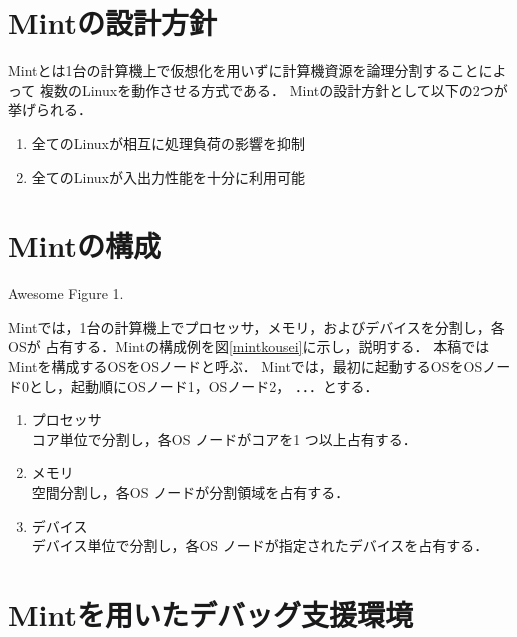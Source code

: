 \documentclass[tanilab-enum]{graduate}
\begin{document}
\section{Mintの設計方針}
Mintとは1台の計算機上で仮想化を用いずに計算機資源を論理分割することによって
複数のLinuxを動作させる方式である．
Mintの設計方針として以下の2つが挙げられる．
\begin{enumerate}
    \item 全てのLinuxが相互に処理負荷の影響を抑制
    \item 全てのLinuxが入出力性能を十分に利用可能
\end{enumerate}
\section{Mintの構成}
{Awesome Figure 1.}

Mintでは，1台の計算機上でプロセッサ，メモリ，およびデバイスを分割し，各OSが
占有する．Mintの構成例を図\ref{mintkousei}に示し，説明する．
本稿ではMintを構成するOSをOSノードと呼ぶ．
Mintでは，最初に起動するOSをOSノード0とし，起動順にOSノード1，OSノード2，
．．．とする．
\begin{enumerate}
    \item プロセッサ\\
        コア単位で分割し，各OS ノードがコアを1 つ以上占有する．
    \item メモリ\\
        空間分割し，各OS ノードが分割領域を占有する．
    \item デバイス\\
        デバイス単位で分割し，各OS ノードが指定されたデバイスを占有する．
\end{enumerate}
\section{Mintを用いたデバッグ支援環境}
\end{document}
